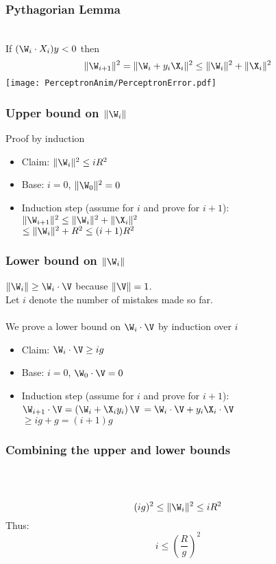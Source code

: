 \documentclass{beamer}
\begin{document}
\begin{frame}
\frametitle{Pythagorian Lemma}
~\\
If $(\W_i \cdot X_i) y <0$ then\\
\pause
\[
\| \W_{i+1} \|^2 = \|\W_i + y_i \X_i\|^2 \leq \|\W_i\|^2 + \|\X_i\|^2 
\]
\pause
\texttt{[image: PerceptronAnim/PerceptronError.pdf]}
\end{frame}

\begin{frame}
\frametitle{Upper bound on $\| \W_i \|$}
\pause
Proof by induction
\begin{itemize}
\item Claim: $ \| \W_{i} \|^2 \leq i R^2 $
\item Base: $i=0$, $\|\W_0\|^2 = 0$
\item Induction step (assume for $i$ and prove for $i+1$):\\
$ \| \W_{i+1} \|^2 \leq \|\W_i\|^2 + \|\X_i\|^2 $ \\
$\leq \|\W_i\|^2 + R^2 \leq (i+1) R^2$

\end{itemize}
\end{frame}

\begin{frame}
\frametitle{Lower bound on $\| \W_i \|$}
\pause
$\|\W_i\| \geq \W_{i} \cdot \V$ because $\| \V \|=1$.\\
\pause
Let $i$ denote the number of mistakes made so far.\\~\\
\pause
We prove a lower bound on $\W_{i} \cdot \V$ by induction over $i$
\begin{itemize}
\item Claim: $ \W_{i} \cdot \V \geq i g $
\item Base: $i=0$, $\W_0 \cdot \V = 0$
\item Induction step (assume for $i$ and prove for $i+1$):\\
$ \W_{i+1} \cdot \V  = \left( \W_i + \X_i y_i \right) \V$
\pause
$= \W_i \cdot \V + y_i \X_i \cdot \V$ \\
$\geq i g + g = (i+1) g$
\end{itemize}
\end{frame}

\begin{frame}
\frametitle{Combining the upper and lower bounds}
~\\
~\\
\pause
$$(ig)^2 \leq \|\W_i\|^2 \leq i R^2$$
\pause
Thus:
$$ i \leq \left(\frac{R}{g} \right)^2 $$
\end{frame}
\end{document}
